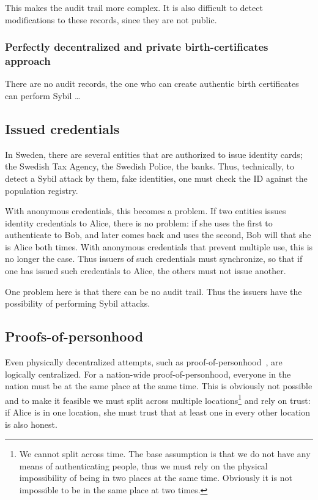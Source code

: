 This makes the audit trail more complex.
It is also difficult to detect modifications to these records, since they are 
not public.

\subsubsection{Perfectly decentralized and private birth-certificates approach}

There are no audit records, the one who can create authentic birth certificates 
can perform Sybil \dots


\subsection{Issued credentials}

In Sweden, there are several entities that are authorized to issue identity 
cards; \eg the Swedish Tax Agency, the Swedish Police, the banks.
Thus, technically, to detect a Sybil attack by them, \ie fake identities, one 
must check the ID against the population registry.

With anonymous credentials, this becomes a problem.
If two entities issues identity credentials to Alice, there is no problem: if 
she uses the first to authenticate to Bob, and later comes back and uses the 
second, Bob will that she is Alice both times.
With anonymous credentials that prevent multiple use, this is no longer the 
case.
Thus issuers of such credentials must synchronize, so that if one has issued 
such credentials to Alice, the others must not issue another.

One problem here is that there can be no audit trail.
Thus the issuers have the possibility of performing Sybil attacks.


\subsection{Proofs-of-personhood}

Even physically decentralized attempts, such as 
proof-of-personhood~\cite{proof-of-personhood}, are logically centralized.
For a nation-wide proof-of-personhood, everyone in the nation must be at the 
same place at the same time.
This is obviously not possible and to make it feasible we must split across 
multiple locations\footnote{%
  We cannot split across time.
  The base assumption is that we do not have any means of authenticating 
  people, thus we must rely on the physical impossibility of being in two 
  places at the same time.
  Obviously it is not impossible to be in the same place at two times.
} and rely on trust: if Alice is in one location, she must trust that at least 
one in every other location is also honest.

